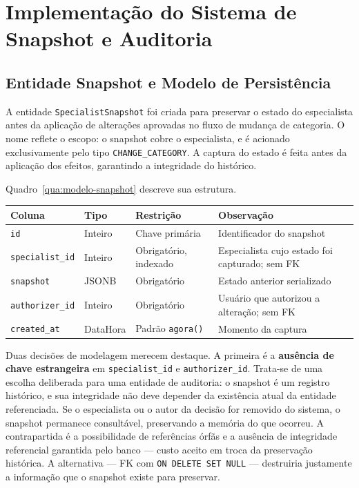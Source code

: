 \section{Implementação do Sistema de Snapshot e Auditoria}
\label{sec:snapshot-auditoria}
\subsection{Entidade Snapshot e Modelo de Persistência}
\label{sec:entidade-snapshot}

A entidade \texttt{SpecialistSnapshot} foi criada para preservar o estado 
do especialista antes da aplicação de alterações aprovadas no fluxo de 
mudança de categoria. O nome reflete o escopo: o snapshot cobre o 
especialista, e é acionado exclusivamente pelo tipo \texttt{CHANGE\_CATEGORY}. 
A captura do estado é feita antes da aplicação dos efeitos, garantindo
a integridade do histórico.

Quadro~\ref{qua:modelo-snapshot} descreve sua estrutura.

\begin{quadro}[htbp]
\centering
\caption[Modelo da entidade SpecialistSnapshot]{Modelo da entidade \texttt{SpecialistSnapshot}.}
\label{qua:modelo-snapshot}
\small
\setlength{\tabcolsep}{4pt}
\begin{tabularx}{\linewidth}{
    @{}
    >{\raggedright\arraybackslash}p{2.4cm}
    >{\raggedright\arraybackslash}p{1.8cm}
    >{\raggedright\arraybackslash}p{3cm}
    >{\raggedright\arraybackslash}X
    @{}
}
\toprule
\textbf{Coluna} & \textbf{Tipo} & \textbf{Restrição} & \textbf{Observação} \\
\midrule
\texttt{id} & Inteiro & Chave primária & Identificador do snapshot \\
\texttt{specialist\_id} & Inteiro & Obrigatório, indexado & Especialista cujo estado foi capturado; sem FK \\
\texttt{snapshot} & JSONB & Obrigatório & Estado anterior serializado \\
\texttt{authorizer\_id} & Inteiro & Obrigatório & Usuário que autorizou a alteração; sem FK \\
\texttt{created\_at} & DataHora & Padrão \texttt{agora()} & Momento da captura \\
\bottomrule
\end{tabularx}
\end{quadro}

Duas decisões de modelagem merecem destaque. A primeira é a 
\textbf{ausência de chave estrangeira} em \texttt{specialist\_id} e 
\texttt{authorizer\_id}. Trata-se de uma escolha deliberada para uma 
entidade de auditoria: o snapshot é um registro histórico, e sua 
integridade não deve depender da existência atual da entidade referenciada. 
Se o especialista ou o autor da decisão for removido do sistema, o 
snapshot permanece consultável, preservando a memória do que ocorreu. A 
contrapartida é a possibilidade de referências órfãs e a ausência de 
integridade referencial garantida pelo banco — custo aceito em troca da 
preservação histórica. A alternativa — FK com \texttt{ON DELETE SET NULL} 
— destruiria justamente a informação que o snapshot existe para preservar.

